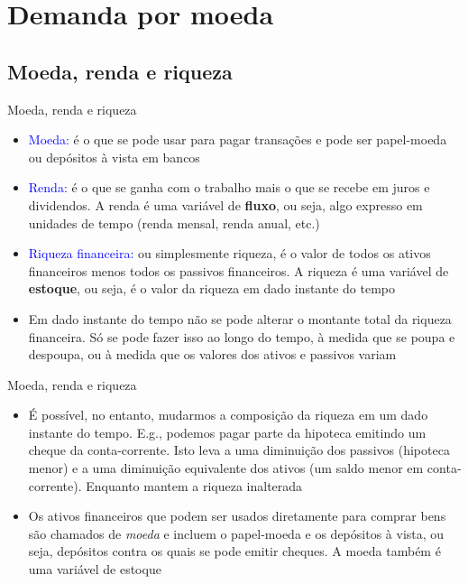 \documentclass[10pt]{beamer}
\begin{document}
\section{Demanda por moeda}
\subsection{Moeda, renda e riqueza}
\begin{frame}{Moeda, renda e riqueza}
    \begin{itemize}
        \item \textcolor{blue}{Moeda:} é o que se pode usar para pagar transações e pode ser papel-moeda ou depósitos à vista em bancos
        \bigskip
        \item \textcolor{blue}{Renda:} é o que se ganha com o trabalho mais o que se recebe em juros e dividendos. A renda é uma variável de \textbf{fluxo}, ou seja, algo expresso em unidades de tempo (renda mensal, renda anual, etc.)
        \bigskip
        \item \textcolor{blue}{Riqueza financeira:} ou simplesmente riqueza, é o valor de todos os ativos financeiros menos todos os passivos financeiros. A riqueza é uma variável de \textbf{estoque}, ou seja, é o valor da riqueza em dado instante do tempo
        \bigskip
        \item Em dado instante do tempo não se pode alterar o montante total da riqueza financeira. Só se pode fazer isso ao longo do tempo, à medida que se poupa e despoupa, ou à medida que os valores dos ativos e passivos variam
    \end{itemize}
\end{frame}

\begin{frame}{Moeda, renda e riqueza}
\begin{itemize}
    \item É possível, no entanto, mudarmos a composição da riqueza em um dado instante do tempo. E.g., podemos pagar parte da hipoteca emitindo um cheque da conta-corrente. Isto leva a uma diminuição dos passivos (hipoteca menor) e a uma diminuição equivalente dos ativos (um saldo menor em conta-corrente). Enquanto mantem a riqueza inalterada
    \bigskip
    \item Os ativos financeiros que podem ser usados diretamente para comprar bens são chamados de \emph{moeda} e incluem o papel-moeda e os depósitos à vista, ou seja, depósitos contra os quais se pode emitir cheques. A moeda também é uma variável de estoque
\end{itemize}
\end{frame}
\end{document}

